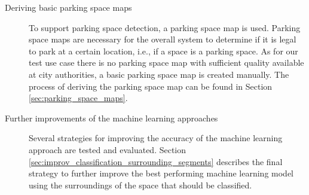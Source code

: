 \begin{description}
\item[Deriving basic parking space maps] To support parking space detection, a parking space map is used. Parking space maps are necessary for the overall system to determine if it is legal to park at a certain location, i.e., if a space is a parking space. As for our test use case there is no parking space map with sufficient quality available at city authorities, a basic parking space map is created manually. The process of deriving the parking space map can be found in Section \ref{sec:parking_space_maps}.

\item[Further improvements of the machine learning approaches] Several strategies for improving the accuracy of the machine learning approach are tested and evaluated. Section \ref{sec:improv_classification_surrounding_segments} describes the final strategy to further improve the best performing machine learning model using the surroundings of the space that should be classified.


\end{description}


%


